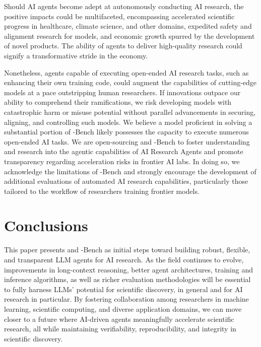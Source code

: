 Should AI agents become adept at autonomously conducting AI research, the positive impacts could be multifaceted, encompassing accelerated scientific progress in healthcare, climate science, and other domains, expedited safety and alignment research for models, and economic growth spurred by the development of novel products. The ability of agents to deliver high-quality research could signify a transformative stride in the economy.

Nonetheless, agents capable of executing open-ended AI research tasks, such as enhancing their own training code, could augment the capabilities of cutting-edge models at a pace outstripping human researchers. If innovations outpace our ability to comprehend their ramifications, we risk developing models with catastrophic harm or misuse potential without parallel advancements in securing, aligning, and controlling such models. We believe a model proficient in solving a substantial portion of \mlgym-Bench likely possesses the capacity to execute numerous open-ended AI tasks. We are open-sourcing \mlgym and \mlgym-Bench to foster understanding and research into the agentic capabilities of AI Research Agents and promote transparency regarding acceleration risks in frontier AI labs. In doing so, we acknowledge the limitations of \mlgym-Bench and strongly encourage the development of additional evaluations of automated AI research capabilities, particularly those tailored to the workflow of researchers training frontier models.


\section{Conclusions}
\label{sec:conclusion}

This paper presents \textsc{\mlgym} and \mlgym-Bench as initial steps toward building robust, flexible, and transparent LLM agents for AI research. As the field continues to evolve, improvements in long-context reasoning, better agent architectures, training and inference algorithms, as well as richer evaluation methodologies will be essential to fully harness LLMs’ potential for scientific discovery, in general and for AI research in particular. By fostering collaboration among researchers in machine learning, scientific computing, and diverse application domains, we can move closer to a future where AI-driven agents meaningfully accelerate scientific research, all while maintaining verifiability, reproducibility, and integrity in scientific discovery.

